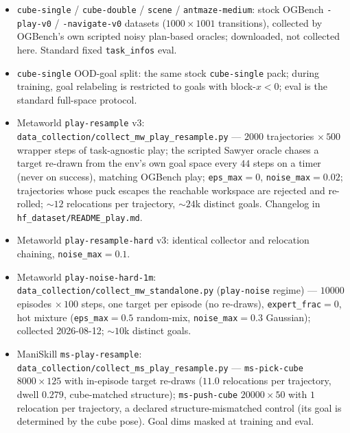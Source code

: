 \documentclass[10pt]{article}
\begin{document}
\begin{itemize}
\item \texttt{cube-single} / \texttt{cube-double} / \texttt{scene} /
\texttt{antmaze-medium}: stock OGBench \texttt{-play-v0} / \texttt{-navigate-v0} datasets
($1000\times1001$ transitions), collected by OGBench's own scripted noisy plan-based
oracles; downloaded, not collected here. Standard fixed \texttt{task\_infos} eval.
\item \texttt{cube-single} OOD-goal split: the same stock \texttt{cube-single} pack;
during training, goal relabeling is restricted to goals with block-$x<0$; eval is the
standard full-space protocol.
\item Metaworld \texttt{play-resample} v3:
\texttt{data\_collection/collect\_mw\_play\_resample.py} --- $2000$ trajectories
$\times\,500$ wrapper steps of task-agnostic play; the scripted Sawyer oracle chases a
target re-drawn from the env's own goal space every $44$ steps on a timer (never on
success), matching OGBench play; \texttt{eps\_max}$=0$, \texttt{noise\_max}$=0.02$;
trajectories whose puck escapes the reachable workspace are rejected and re-rolled;
${\sim}12$ relocations per trajectory, ${\sim}24$k distinct goals. Changelog in
\texttt{hf\_dataset/README\_play.md}.
\item Metaworld \texttt{play-resample-hard} v3: identical collector and relocation
chaining, \texttt{noise\_max}$=0.1$.
\item Metaworld \texttt{play-noise-hard-1m}:
\texttt{data\_collection/collect\_mw\_standalone.py} (\texttt{play-noise} regime) ---
$10000$ episodes $\times\,100$ steps, one target per episode (no re-draws),
\texttt{expert\_frac}$=0$, hot mixture (\texttt{eps\_max}$=0.5$ random-mix,
\texttt{noise\_max}$=0.3$ Gaussian); collected 2026-08-12; ${\sim}10$k distinct goals.
\item ManiSkill \texttt{ms-play-resample}:
\texttt{data\_collection/collect\_ms\_play\_resample.py} --- \texttt{ms-pick-cube}
$8000\times125$ with in-episode target re-draws ($11.0$ relocations per trajectory, dwell
$0.279$, cube-matched structure); \texttt{ms-push-cube} $20000\times50$ with $1$
relocation per trajectory, a declared structure-mismatched control (its goal is determined
by the cube pose). Goal dims masked at training and eval.
\end{itemize}
\end{document}
